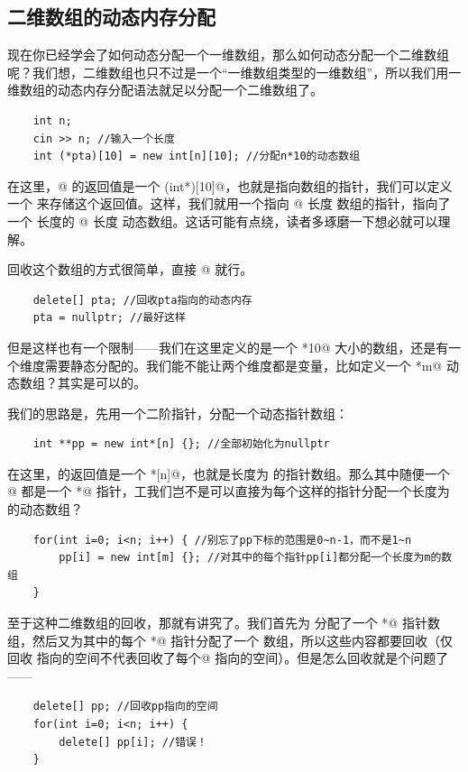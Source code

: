 \subsection*{二维数组的动态内存分配}
现在你已经学会了如何动态分配一个一维数组，那么如何动态分配一个二维数组呢？我们想，二维数组也只不过是一个``一维数组类型的一维数组''，所以我们用一维数组的动态内存分配语法就足以分配一个二维数组了。
\begin{lstlisting}
    int n;
    cin >> n; //输入一个长度
    int (*pta)[10] = new int[n][10]; //分配n*10的动态数组
\end{lstlisting}
在这里，\lstinline@new[]@ 的返回值是一个 \lstinline@(int*)[10]@，也就是指向数组的指针，我们可以定义一个 \lstinline@pta@ 来存储这个返回值。这样，我们就用一个指向 @ 长度 \lstinline@int@ 数组的指针，指向了一个 \lstinline@n@ 长度的 @ 长度 \lstinline@int@ 动态数组。这话可能有点绕，读者多琢磨一下想必就可以理解。\par
回收这个数组的方式很简单，直接 \lstinline@delete[]@ 就行。
\begin{lstlisting}
    delete[] pta; //回收pta指向的动态内存
    pta = nullptr; //最好这样
\end{lstlisting}\par
但是这样也有一个限制——我们在这里定义的是一个 \lstinline@n*10@ 大小的数组，还是有一个维度需要静态分配的。我们能不能让两个维度都是变量，比如定义一个 \lstinline@n*m@ 动态数组？其实是可以的。\par
我们的思路是，先用一个二阶指针，分配一个动态指针数组：
\begin{lstlisting}
    int **pp = new int*[n] {}; //全部初始化为nullptr
\end{lstlisting}
在这里，\lstinline@new@ 的返回值是一个 \lstinline@int*[n]@，也就是长度为 \lstinline@n@ 的指针数组。那么其中随便一个 \lstinline@pp[i]@ 都是一个 \lstinline@int*@ 指针，工我们岂不是可以直接为每个这样的指针分配一个长度为 \lstinline@m@ 的动态数组？
\begin{lstlisting}
    for(int i=0; i<n; i++) { //别忘了pp下标的范围是0~n-1，而不是1~n
        pp[i] = new int[m] {}; //对其中的每个指针pp[i]都分配一个长度为m的数组
    }
\end{lstlisting}
至于这种二维数组的回收，那就有讲究了。我们首先为 \lstinline@pp@ 分配了一个 \lstinline@int*@ 指针数组，然后又为其中的每个 \lstinline@int*@ 指针分配了一个 \lstinline@int@ 数组，所以这些内容都要回收（仅回收 \lstinline@pp@ 指向的空间不代表回收了每个\lstinline@pp[i]@ 指向的空间）。但是怎么回收就是个问题了——
\begin{lstlisting}
    delete[] pp; //回收pp指向的空间
    for(int i=0; i<n; i++) {
        delete[] pp[i]; //错误！
    }
\end{lstlisting}
